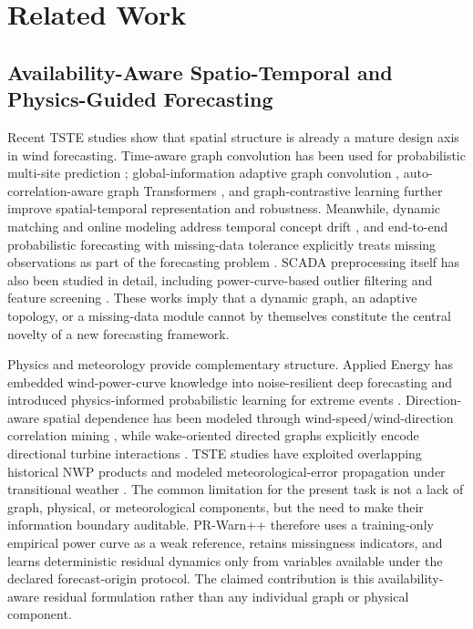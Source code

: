 \documentclass[journal]{IEEEtran}
\newcommand{\1}{\mathbb{I}}
\begin{document}
\section{Related Work}
\subsection{Availability-Aware Spatio-Temporal and Physics-Guided Forecasting}
Recent TSTE studies show that spatial structure is already a mature design axis in wind forecasting. Time-aware graph convolution has been used for probabilistic multi-site prediction \cite{tang2024timeaware}; global-information adaptive graph convolution \cite{yang2024gcn}, auto-correlation-aware graph Transformers \cite{liang2025wpformer}, and graph-contrastive learning \cite{liu2025graphcontrast} further improve spatial-temporal representation and robustness. Meanwhile, dynamic matching and online modeling address temporal concept drift \cite{li2025dynamic}, and end-to-end probabilistic forecasting with missing-data tolerance explicitly treats missing observations as part of the forecasting problem \cite{meng2026missing}. SCADA preprocessing itself has also been studied in detail, including power-curve-based outlier filtering and feature screening \cite{liu2025periodic}. These works imply that a dynamic graph, an adaptive topology, or a missing-data module cannot by themselves constitute the central novelty of a new forecasting framework.

Physics and meteorology provide complementary structure. Applied Energy has embedded wind-power-curve knowledge into noise-resilient deep forecasting \cite{gao2025tgdpF} and introduced physics-informed probabilistic learning for extreme events \cite{liu2024physicsrl}. Direction-aware spatial dependence has been modeled through wind-speed/wind-direction correlation mining \cite{wang2025clustergraph}, while wake-oriented directed graphs explicitly encode directional turbine interactions \cite{hou2026wake}. TSTE studies have exploited overlapping historical NWP products \cite{zhao2025nwp} and modeled meteorological-error propagation under transitional weather \cite{zhang2026transitional}. The common limitation for the present task is not a lack of graph, physical, or meteorological components, but the need to make their information boundary auditable. PR-Warn++ therefore uses a training-only empirical power curve as a weak reference, retains missingness indicators, and learns deterministic residual dynamics only from variables available under the declared forecast-origin protocol. The claimed contribution is this availability-aware residual formulation rather than any individual graph or physical component.
\end{document}
